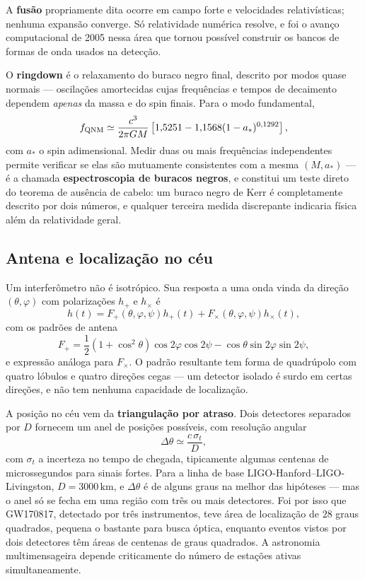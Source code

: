 \documentclass[11pt,a4paper]{article}
\begin{document}
A \textbf{fusão} propriamente dita ocorre em campo forte e velocidades relativísticas; nenhuma expansão converge. Só relatividade numérica resolve, e foi o avanço computacional de 2005 nessa área que tornou possível construir os bancos de formas de onda usados na detecção.

O \textbf{ringdown} é o relaxamento do buraco negro final, descrito por modos quase normais --- oscilações amortecidas cujas frequências e tempos de decaimento dependem \emph{apenas} da massa e do spin finais. Para o modo fundamental,
\[
f_{\rm QNM}\simeq\frac{c^{3}}{2\pi GM}\left[1{,}5251-1{,}1568(1-a_*)^{0{,}1292}\right],
\]
com $a_*$ o spin adimensional. Medir duas ou mais frequências independentes permite verificar se elas são mutuamente consistentes com a mesma $(M,a_*)$ --- é a chamada \textbf{espectroscopia de buracos negros}, e constitui um teste direto do teorema de ausência de cabelo: um buraco negro de Kerr é completamente descrito por dois números, e qualquer terceira medida discrepante indicaria física além da relatividade geral.

\subsection*{Antena e localização no céu}

Um interferômetro não é isotrópico. Sua resposta a uma onda vinda da direção $(\theta,\varphi)$ com polarizações $h_+$ e $h_\times$ é
\[
h(t)=F_+(\theta,\varphi,\psi)h_+(t)+F_\times(\theta,\varphi,\psi)h_\times(t),
\]
com os padrões de antena
\[
F_+=\frac{1}{2}\left(1+\cos^{2}\theta\right)\cos2\varphi\cos2\psi-\cos\theta\sin2\varphi\sin2\psi,
\]
e expressão análoga para $F_\times$. O padrão resultante tem forma de quadrúpolo com quatro lóbulos e quatro direções cegas --- um detector isolado é surdo em certas direções, e não tem nenhuma capacidade de localização.

A posição no céu vem da \textbf{triangulação por atraso}. Dois detectores separados por $D$ fornecem um anel de posições possíveis, com resolução angular
\[
\Delta\theta\simeq\frac{c\,\sigma_t}{D},
\]
com $\sigma_t$ a incerteza no tempo de chegada, tipicamente algumas centenas de microssegundos para sinais fortes. Para a linha de base LIGO-Hanford--LIGO-Livingston, $D=3000\,\mathrm{km}$, e $\Delta\theta$ é de alguns graus na melhor das hipóteses --- mas o anel só se fecha em uma região com três ou mais detectores. Foi por isso que GW170817, detectado por três instrumentos, teve área de localização de $28$ graus quadrados, pequena o bastante para busca óptica, enquanto eventos vistos por dois detectores têm áreas de centenas de graus quadrados. A astronomia multimensageira depende criticamente do número de estações ativas simultaneamente.
\end{document}

